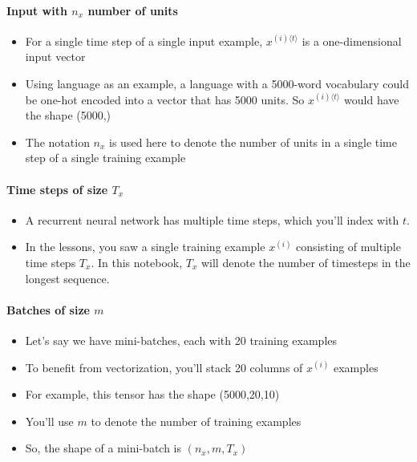 \documentclass[11pt]{article}
\providecommand{\tightlist}{%
      \setlength{\itemsep}{0pt}\setlength{\parskip}{0pt}}
\begin{document}
\hypertarget{input-with-n_x-number-of-units}{%
\paragraph{\texorpdfstring{Input with \(n_x\) number of
units}{Input with n\_x number of units}}\label{input-with-n_x-number-of-units}}

\begin{itemize}
\tightlist
\item
  For a single time step of a single input example,
  \(x^{(i) \langle t \rangle }\) is a one-dimensional input vector
\item
  Using language as an example, a language with a 5000-word vocabulary
  could be one-hot encoded into a vector that has 5000 units. So
  \(x^{(i)\langle t \rangle}\) would have the shape (5000,)\\
\item
  The notation \(n_x\) is used here to denote the number of units in a
  single time step of a single training example
\end{itemize}

    \hypertarget{time-steps-of-size-t_x}{%
\paragraph{\texorpdfstring{Time steps of size
\(T_{x}\)}{Time steps of size T\_\{x\}}}\label{time-steps-of-size-t_x}}

\begin{itemize}
\tightlist
\item
  A recurrent neural network has multiple time steps, which you'll index
  with \(t\).
\item
  In the lessons, you saw a single training example \(x^{(i)}\)
  consisting of multiple time steps \(T_x\). In this notebook, \(T_{x}\)
  will denote the number of timesteps in the longest sequence.
\end{itemize}

    \hypertarget{batches-of-size-m}{%
\paragraph{\texorpdfstring{Batches of size
\(m\)}{Batches of size m}}\label{batches-of-size-m}}

\begin{itemize}
\tightlist
\item
  Let's say we have mini-batches, each with 20 training examples\\
\item
  To benefit from vectorization, you'll stack 20 columns of \(x^{(i)}\)
  examples
\item
  For example, this tensor has the shape (5000,20,10)
\item
  You'll use \(m\) to denote the number of training examples\\
\item
  So, the shape of a mini-batch is \((n_x,m,T_x)\)
\end{itemize}
\end{document}
